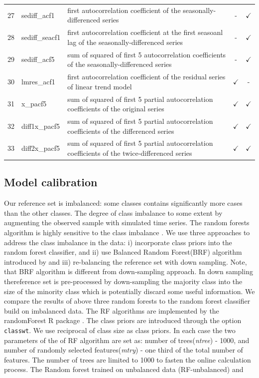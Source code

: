 \documentclass[11pt,a4paper,]{article}
\theoremstyle{definition}
\theoremstyle{definition}
\theoremstyle{definition}
\theoremstyle{remark}
\begin{document}
\begin{table}[!p]
\begin{tabular}{llp{7.5cm}cc}
27 & sediff\_acf1   & first autocorrelation coefficient of the seasonally-differenced series                           & -             & $\checkmark$\\
28 & sediff\_seacf1 & first autocorrelation coefficient at the first seasoanl lag of the seasonally-differenced series & -             & $\checkmark$ \\
29 & sediff\_acf5   & sum of squared of first 5 autocorrelation coefficients of the seasonally-differenced series      & -             & $\checkmark$ \\
30 & lmres\_acf1    & first autocorrelation coefficient of the residual series of linear trend model                   & $\checkmark$  & - \\
31 & x\_pacf5       & sum of squared of first 5 partial autocorrelation coefficients of the original series            & $\checkmark$  & $\checkmark$ \\
32 & diff1x\_pacf5  & sum of squared of first 5 partial autocorrelation coefficients of the differenced series         & $\checkmark$  & $\checkmark$ \\
33 & diff2x\_pacf5  & sum of squared of first 5 partial autocorrelation coefficients of the twice-differenced series   & $\checkmark$  & $\checkmark$ \\
\bottomrule
 \end{tabular}
\end{table}

\subsection{Model calibration}\label{model-calibration}

Our reference set is imbalanced: some classes contains significantly
more cases than the other classes. The degree of class imbalance to some
extent by augmenting the observed sample with simulated time series. The
random forests algorithm is highly sensitive to the class imbalance
\autocite{breiman2001random}. We use three approaches to address the
class imbalance in the data: i) incorporate class priors into the random
forest classifier, and ii) use Balanced Random Forest(BRF) algorithm
introduced by \textcite{chen2004using} and iii) re-balancing the
reference set with down sampling. Note, that BRF algorithm is different
from down-sampling approach. In down sampling thereference set is
pre-processed by down-sampling the majority class into the size of the
minority class which is potentially discard some useful information. We
compare the results of above three random forests to the random forest
classifier build on imbalanced data. The RF algorithms are implemented
by the randomForest R package \autocite{liaw2002randomforest}. The class
priors are introduced through the option \texttt{classwt}. We use
reciprocal of class size as class priors. In each case the two
parameters of the of RF algorithm are set as: number of
trees(\emph{ntree}) - 1000, and number of randomly selected
features(\emph{mtry}) - one third of the total number of features. The
number of trees are limited to 1000 to fasten the online calculation
process. The Random forest trained on unbalanced data (RF-unbalanced)
and
\end{document}
